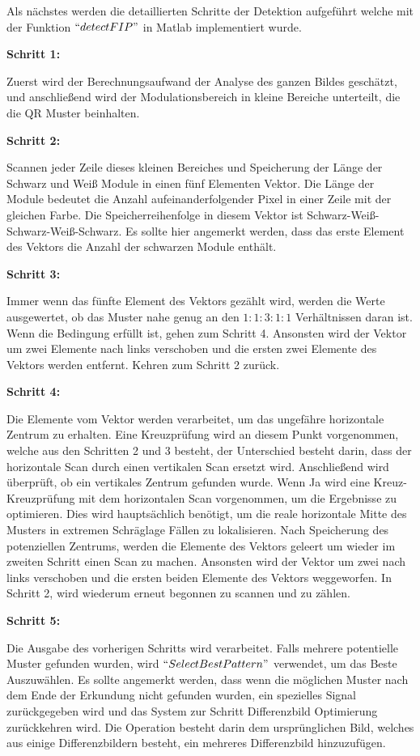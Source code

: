 Als nächstes werden die detaillierten Schritte der Detektion aufgeführt welche mit der Funktion $ ``detectFIP" $ in Matlab implementiert wurde.

\textbf{Schritt 1:}

Zuerst wird der Berechnungsaufwand der Analyse des ganzen Bildes geschätzt, und anschließend wird der Modulationsbereich in kleine Bereiche unterteilt, die die QR Muster beinhalten.

\textbf{Schritt 2:}

Scannen jeder Zeile dieses kleinen Bereiches und Speicherung der Länge der Schwarz und Weiß Module in einen fünf Elementen Vektor. Die Länge der Module bedeutet die Anzahl aufeinanderfolgender Pixel in einer Zeile mit der gleichen Farbe. Die Speicherreihenfolge in diesem Vektor ist Schwarz-Weiß-Schwarz-Weiß-Schwarz. Es sollte hier angemerkt werden, dass das erste Element des Vektors die Anzahl der schwarzen Module enthält. 

\textbf{Schritt 3:}

Immer wenn das fünfte Element des Vektors gezählt wird, werden die Werte ausgewertet, ob das Muster nahe genug an den $1:1:3:1:1$ Verhältnissen daran ist. Wenn die Bedingung erfüllt ist, gehen zum Schritt 4. Ansonsten wird der Vektor um zwei Elemente nach links verschoben und die ersten zwei Elemente des Vektors werden entfernt. Kehren zum Schritt 2 zurück.
              

\textbf{Schritt 4:}

Die Elemente vom Vektor werden verarbeitet, um das ungefähre horizontale Zentrum zu erhalten. Eine Kreuzprüfung wird an diesem Punkt vorgenommen, welche aus den Schritten 2 und 3 besteht, der Unterschied besteht darin, dass der horizontale Scan durch einen vertikalen Scan ersetzt wird. Anschließend wird überprüft, ob ein vertikales Zentrum gefunden wurde. Wenn Ja wird eine Kreuz-Kreuzprüfung mit dem horizontalen Scan vorgenommen, um die Ergebnisse zu optimieren. Dies wird hauptsächlich benötigt, um die reale horizontale Mitte des Musters in extremen Schräglage Fällen zu lokalisieren. Nach Speicherung des potenziellen Zentrums, werden die Elemente des Vektors geleert um wieder im zweiten Schritt einen Scan zu machen. Ansonsten wird der Vektor um zwei nach links verschoben und die ersten beiden Elemente des Vektors weggeworfen. In Schritt 2, wird wiederum erneut begonnen zu scannen und zu zählen.  

\textbf{Schritt 5:}

Die Ausgabe des vorherigen Schritts wird verarbeitet. Falls mehrere potentielle Muster gefunden wurden, wird $ ``Select Best Pattern" $ verwendet, um das Beste Auszuwählen. Es sollte angemerkt werden, dass wenn die möglichen Muster nach dem Ende der Erkundung nicht gefunden wurden, ein spezielles Signal zurückgegeben wird und das System zur Schritt Differenzbild Optimierung zurückkehren wird. Die Operation besteht darin dem ursprünglichen Bild, welches aus einige Differenzbildern besteht, ein mehreres Differenzbild hinzuzufügen.
                       
